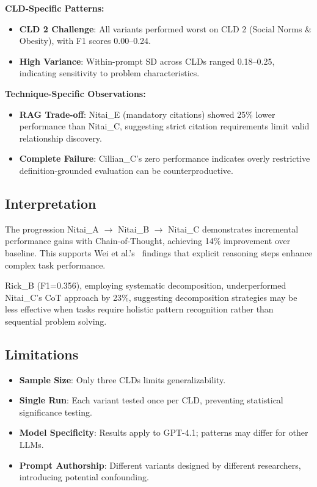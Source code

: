 \textbf{CLD-Specific Patterns:}
\begin{itemize}[noitemsep]
    \item \textbf{CLD 2 Challenge}: All variants performed worst on CLD 2 (Social Norms \& Obesity), with F1 scores 0.00--0.24.
    \item \textbf{High Variance}: Within-prompt SD across CLDs ranged 0.18--0.25, indicating sensitivity to problem characteristics.
\end{itemize}

\textbf{Technique-Specific Observations:}
\begin{itemize}[noitemsep]
    \item \textbf{RAG Trade-off}: Nitai\_E (mandatory citations) showed 25\% lower performance than Nitai\_C, suggesting strict citation requirements limit valid relationship discovery.
    \item \textbf{Complete Failure}: Cillian\_C's zero performance indicates overly restrictive definition-grounded evaluation can be counterproductive.
\end{itemize}

\subsection{Interpretation}

The progression Nitai\_A $\rightarrow$ Nitai\_B $\rightarrow$ Nitai\_C demonstrates incremental performance gains with Chain-of-Thought, achieving 14\% improvement over baseline. This supports Wei et al.'s~\cite{wei2022cot} findings that explicit reasoning steps enhance complex task performance.

Rick\_B (F1=0.356), employing systematic decomposition, underperformed Nitai\_C's CoT approach by 23\%, suggesting decomposition strategies may be less effective when tasks require holistic pattern recognition rather than sequential problem solving.

\subsection{Limitations}

\begin{itemize}[noitemsep]
    \item \textbf{Sample Size}: Only three CLDs limits generalizability.
    \item \textbf{Single Run}: Each variant tested once per CLD, preventing statistical significance testing.
    \item \textbf{Model Specificity}: Results apply to GPT-4.1; patterns may differ for other LLMs.
    \item \textbf{Prompt Authorship}: Different variants designed by different researchers, introducing potential confounding.
\end{itemize}

